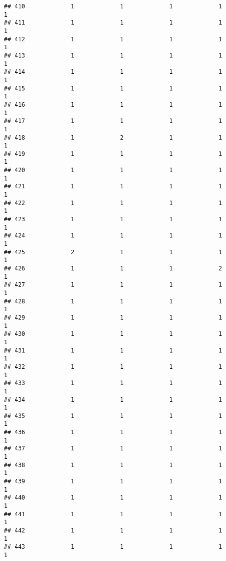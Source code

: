 \documentclass[
]{article}
\begin{document}
\begin{verbatim}
## 410             1             1             1             1             1
## 411             1             1             1             1             1
## 412             1             1             1             1             1
## 413             1             1             1             1             1
## 414             1             1             1             1             1
## 415             1             1             1             1             1
## 416             1             1             1             1             1
## 417             1             1             1             1             1
## 418             1             2             1             1             1
## 419             1             1             1             1             1
## 420             1             1             1             1             1
## 421             1             1             1             1             1
## 422             1             1             1             1             1
## 423             1             1             1             1             1
## 424             1             1             1             1             1
## 425             2             1             1             1             1
## 426             1             1             1             2             1
## 427             1             1             1             1             1
## 428             1             1             1             1             1
## 429             1             1             1             1             1
## 430             1             1             1             1             1
## 431             1             1             1             1             1
## 432             1             1             1             1             1
## 433             1             1             1             1             1
## 434             1             1             1             1             1
## 435             1             1             1             1             1
## 436             1             1             1             1             1
## 437             1             1             1             1             1
## 438             1             1             1             1             1
## 439             1             1             1             1             1
## 440             1             1             1             1             1
## 441             1             1             1             1             1
## 442             1             1             1             1             1
## 443             1             1             1             1             1

\end{verbatim}
\end{document}
